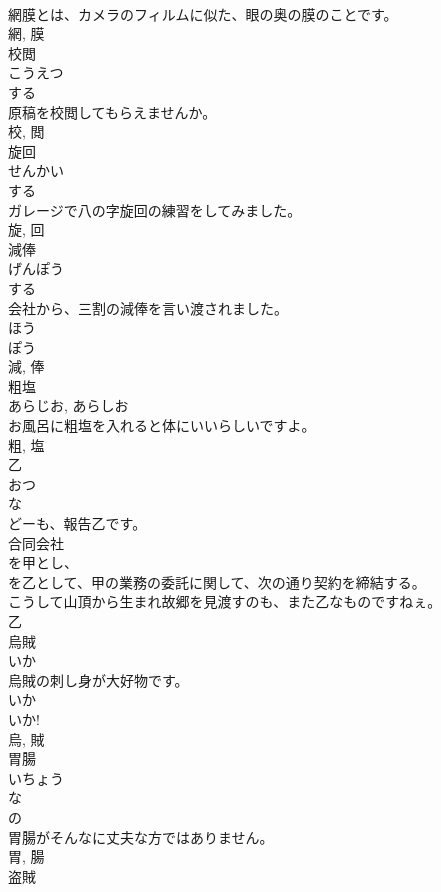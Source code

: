 \documentclass[8pt]{extreport}
\begin{document}
\begin{CJK}{UTF8}{min}
\\	網膜とは、カメラのフィルムに似た、眼の奥の膜のことです。	
\\	網, 膜	
\\	校閲	
\\	こうえつ	
\\	する 
\\	原稿を校閲してもらえませんか。	
\\	校, 閲	
\\	旋回	
\\	せんかい	
\\	する 
\\	ガレージで八の字旋回の練習をしてみました。	
\\	旋, 回	
\\	減俸	
\\	げんぽう	
\\	する 
\\	会社から、三割の減俸を言い渡されました。	
\\	ほう 
\\	ぽう 
\\	減, 俸	
\\	粗塩	
\\	あらじお, あらしお	
\\	お風呂に粗塩を入れると体にいいらしいですよ。	
\\	粗, 塩	
\\	乙	
\\	おつ	
\\	な 
\\	どーも、報告乙です。	
\\	合同会社
\\	を甲とし、
\\	を乙として、甲の業務の委託に関して、次の通り契約を締結する。	
\\	こうして山頂から生まれ故郷を見渡すのも、また乙なものですねぇ。	
\\	乙	
\\	烏賊	
\\	いか	
\\	烏賊の刺し身が大好物です。	
\\	いか 
\\	いか! 
\\	烏, 賊	
\\	胃腸	
\\	いちょう	
\\	な 
\\	の 
\\	胃腸がそんなに丈夫な方ではありません。	
\\	胃, 腸	
\\	盗賊	

\end{CJK}
\end{document}
